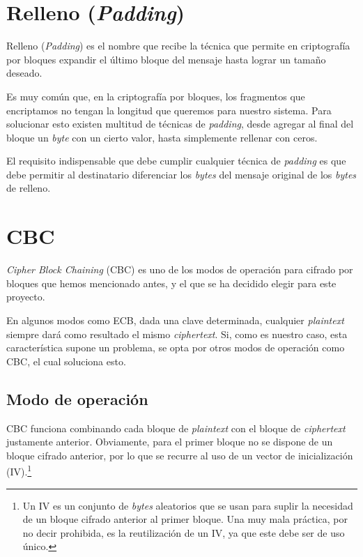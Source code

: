 
\section{Relleno (\emph{Padding})}

Relleno (\emph{Padding}) es el nombre que recibe la técnica que permite en criptografía por bloques expandir el último bloque del mensaje hasta lograr un tamaño deseado.

Es muy común que, en la criptografía por bloques, los fragmentos que encriptamos no tengan la longitud que queremos para nuestro sistema. Para solucionar esto existen multitud de técnicas de \emph{padding}, desde agregar al final del bloque un \emph{byte} con un cierto valor, hasta simplemente rellenar con ceros.

El requisito indispensable que debe cumplir cualquier técnica de \emph{padding} es que debe permitir al destinatario diferenciar los \emph{bytes} del mensaje original de los \emph{bytes} de relleno. \emph{\parencite{Reference8}}


\section{CBC}

\emph{Cipher Block Chaining} (CBC) es uno de los modos de operación para cifrado por bloques que hemos mencionado antes, y el que se ha decidido elegir para este proyecto.

En algunos modos como ECB, dada una clave determinada, cualquier \emph{plaintext} siempre dará como resultado el mismo \emph{ciphertext}. Si, como es nuestro caso, esta característica supone un problema, se opta por otros modos de operación como CBC, el cual soluciona esto. \emph{\parencite{Reference23}}

\subsection{Modo de operación}

CBC funciona combinando cada bloque de \emph{plaintext} con el bloque de \emph{ciphertext} justamente anterior. Obviamente, para el primer bloque no se dispone de un bloque cifrado anterior, por lo que se recurre al uso de un vector de inicialización (IV).\footnote{Un IV es un conjunto de \emph{bytes} aleatorios que se usan para suplir la necesidad de un bloque cifrado anterior al primer bloque. Una muy mala práctica, por no decir prohibida, es la reutilización de un IV, ya que este debe ser de uso único.}

